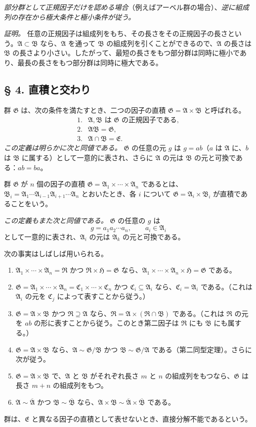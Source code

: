 \documentclass[11pt]{article}
\providecommand{\mG}{\mathfrak{G}}
\providecommand{\mA}{\mathfrak{A}}
\providecommand{\mB}{\mathfrak{B}}
\providecommand{\mC}{\mathfrak{C}}
\providecommand{\mE}{\mathfrak{E}}
\providecommand{\mH}{\mathfrak{H}}
\providecommand{\mR}{\mathfrak{R}}
\begin{document}
\emph{部分群として正規因子だけを認める場合}（例えばアーベル群の場合）、\emph{逆に組成列の存在から極大条件と極小条件が従う。}

\emph{証明。} 任意の正規因子は組成列をもち、その長さをその正規因子の長さという。$\mA\subset\mB$ なら、$\mA$ を通って $\mB$ の組成列を引くことができるので、$\mA$ の長さは $\mB$ の長さより小さい。したがって、最短の長さをもつ部分群は同時に極小であり、最長の長さをもつ部分群は同時に極大である。

\subsection*{§ 4. 直積と交わり}

群 $\mG$ は、次の条件を満たすとき、二つの因子の直積 $\mG=\mA\times\mB$ と呼ばれる。
\[
\begin{array}{ll}
1.& \mA,\mB\text{ は }\mG\text{ の正規因子である},\\
2.& \mA\mB=\mG,\\
3.& \mA\cap\mB=\mE.
\end{array}
\]
\emph{この定義は明らかに次と同値である。} $\mG$ の任意の元 $g$ は $g=ab$（$a$ は $\mA$ に、$b$ は $\mB$ に属する）として一意的に表され、さらに $\mA$ の元は $\mB$ の元と可換である：$ab=ba$。

群 $\mG$ が $n$ 個の因子の直積 $\mG=\mA_1\times\cdots\times\mA_n$ であるとは、$\mB_i=\mA_1\cdots\mA_{i-1}\mA_{i+1}\cdots\mA_n$ とおいたとき、各 $i$ について $\mG=\mA_i\times\mB_i$ が直積であることをいう。

\emph{この定義もまた次と同値である。} $\mG$ の任意の $g$ は
\[
        g=a_1a_2\cdots a_n,\qquad a_i\in\mA_i
\]
として一意的に表され、$\mA_i$ の元は $\mA_k$ の元と可換である。

次の事実はしばしば用いられる。
\begin{enumerate}
\item $\mA_1\times\cdots\times\mA_n=\mR$ かつ $\mR\times\mH=\mG$ なら、$\mA_1\times\cdots\times\mA_n\times\mH=\mG$ である。
\item $\mG=\mA_1\times\cdots\times\mA_n=\mC_1\times\cdots\times\mC_n$ かつ $\mC_i\subseteq\mA_i$ なら、$\mC_i=\mA_i$ である。（これは $\mA_i$ の元を $\mC_j$ によって表すことから従う。）
\item $\mG=\mA\times\mB$ かつ $\mR\supseteq\mA$ なら、$\mR=\mA\times(\mR\cap\mB)$ である。（これは $\mR$ の元を $ab$ の形に表すことから従う。このとき第二因子は $\mR$ にも $\mB$ にも属する。）
\item $\mG=\mA\times\mB$ なら、$\mA\sim\mG/\mB$ かつ $\mB\sim\mG/\mA$ である（第二同型定理）。さらに次が従う。
\item $\mG=\mA\times\mB$ で、$\mA$ と $\mB$ がそれぞれ長さ $m$ と $n$ の組成列をもつなら、$\mG$ は長さ $m+n$ の組成列をもつ。
\item $\mA\sim\overline{\mA}$ かつ $\mB\sim\overline{\mB}$ なら、$\mA\times\mB\sim\overline{\mA}\times\overline{\mB}$ である。
\end{enumerate}
群は、$\mE$ と異なる因子の直積として表せないとき、直接分解不能であるという。
\end{document}
